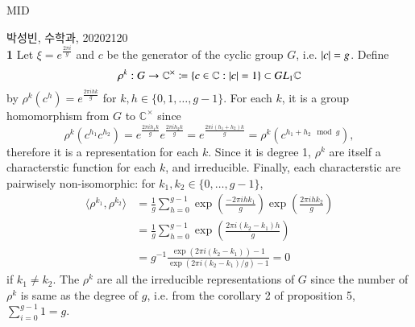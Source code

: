 \documentclass[a4paper, 12pt]{article}
\theoremstyle{Mydefinition}
\theoremstyle{Mytheorem}
\begin{document}
\thispagestyle{myfirstpage}
\begin{center}
	\Large{MID}
\end{center}
박성빈, 수학과, 20202120\\

\noindent \textbf{1}
Let $\xi = e^{\frac{2\pi i}{g}}$ and $c$ be the generator of the cyclic group $G$, i.e. $\abs{c} = g$. Define 
\begin{equation}
    \rho^k:G\rightarrow \mathbb{C}^\times\coloneqq \{c\in \mathbb{C}:\abs{c}=1\}\subset GL_1\mathbb{C}
\end{equation}
by $\rho^k(c^h) = e^{\frac{2\pi ihk}{g}}$ for $k,h\in \{0, 1, \ldots, g-1\}$. For each $k$, it is a group homomorphism from $G$ to $\mathbb{C}^\times$ since 
\begin{equation}
    \rho^k(c^{h_1}c^{h_2}) = e^{\frac{2\pi ih_1k}{g}}e^{\frac{2\pi ih_2k}{g}} = e^{\frac{2\pi i(h_1+h_2)k}{g}} = \rho^k(c^{h_1+h_2\mod g}),
\end{equation}
therefore it is a representation for each $k$. Since it is degree 1, $\rho^k$ are itself a characterstic function for each $k$, and irreducible. Finally, each characterstic are pairwisely non-isomorphic: for $k_1,k_2\in \{0, \ldots, g-1\}$,
\begin{equation}
\begin{split}
    \langle \rho^{k_1}, \rho^{k_2}\rangle &= \frac{1}{g}\sum_{h=0}^{g-1}\exp\left(\frac{-2\pi ihk_1}{g}\right)\exp\left(\frac{2\pi ihk_2}{g}\right)\\
    &=\frac{1}{g}\sum_{h=0}^{g-1}\exp\left(\frac{2\pi i(k_2-k_1)h}{g}\right)\\
    &=g^{-1}\frac{\exp\left(2\pi i(k_2-k_1)\right)-1}{\exp\left(2\pi i(k_2-k_1)/g\right) - 1} = 0
\end{split}
\end{equation}
if $k_1\neq k_2$. The $\rho^k$ are all the irreducible representations of $G$ since the number of $\rho^k$ is same as the degree of $g$, i.e. from the corollary 2 of proposition 5, $\sum_{i=0}^{g-1}1 = g$.\\
\end{document}
